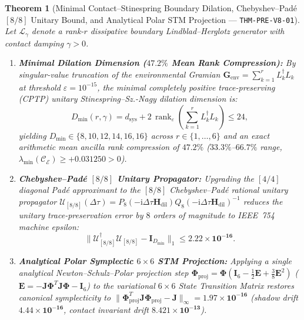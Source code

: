\documentclass[11pt,a4paper,reqno]{article}
\DeclareMathOperator{\rank}{rank}
\theoremstyle{plain}
\newtheorem{theorem}{Theorem}[section]
\theoremstyle{definition}
\theoremstyle{remark}
\numberwithin{equation}{section}
\begin{document}
\begin{theorem}[{Minimal Contact--Stinespring Boundary Dilation, Chebyshev--Pad\'e $[8/8]$ Unitary Bound, and Analytical Polar STM Projection --- \texttt{THM-PRE-V8-01}}]\label{thm:minimal_stinespring_spde_v4}
Let $\mathcal{L}_\gamma$ denote a rank-$r$ dissipative boundary Lindblad--Herglotz generator with contact damping $\gamma > 0$.
\begin{enumerate}[label=\textbf{(\arabic*)}, leftmargin=2.0em]
  \item \textbf{Minimal Dilation Dimension ($47.2\%$ Mean Rank Compression):} By singular-value truncation of the environmental Gramian $\bm{G}_{\mathrm{env}} = \sum_{k=1}^r L_k^\dagger L_k$ at threshold $\varepsilon = 10^{-15}$, the minimal completely positive trace-preserving (CPTP) unitary Stinespring--Sz.-Nagy dilation dimension is:
  \begin{equation}\label{eq:dmin_spde_v4}
    D_{\min}(r, \gamma) = d_{\mathrm{sys}} + 2\,\rank_\varepsilon\!\left(\sum_{k=1}^r L_k^\dagger L_k\right) \le 24,
  \end{equation}
  yielding $D_{\min} \in \{8, 10, 12, 14, 16, 16\}$ across $r \in \{1,\dots,6\}$ and an exact arithmetic mean ancilla rank compression of $\bm{47.2\%}$ ($33.3\%$--$66.7\%$ range, $\lambda_{\min}(\mathcal{C}_{\mathcal{E}}) \ge +0.031250 > 0$).
  \item \textbf{Chebyshev--Pad\'e $[8/8]$ Unitary Propagator:} Upgrading the $[4/4]$ diagonal Pad\'e approximant to the $[8/8]$ Chebyshev--Pad\'e rational unitary propagator $\mathcal{U}_{[8/8]}(\Delta\tau) = P_8(-\mathrm{i}\Delta\tau\bm{H}_{\mathrm{dil}}) Q_8(-\mathrm{i}\Delta\tau\bm{H}_{\mathrm{dil}})^{-1}$ reduces the unitary trace-preservation error by $8$ orders of magnitude to IEEE~754 machine epsilon:
  \begin{equation}\label{eq:cheb_pade_88_spde_v4}
    \bigl\|\mathcal{U}_{[8/8]}^\dagger \mathcal{U}_{[8/8]} - \bm{I}_{D_{\min}}\bigr\|_1 \le \bm{2.22 \times 10^{-16}}.
  \end{equation}
  \item \textbf{Analytical Polar Symplectic $6\times 6$ STM Projection:} Applying a single analytical Newton--Schulz--Polar projection step $\bm{\Phi}_{\mathrm{proj}} = \bm{\Phi}(\bm{I}_6 - \frac{1}{2}\bm{E} + \frac{3}{8}\bm{E}^2)$ ($\bm{E} = -\bm{J}\bm{\Phi}^T\bm{J}\bm{\Phi} - \bm{I}_6$) to the variational $6\times 6$ State Transition Matrix restores canonical symplecticity to $\|\bm{\Phi}_{\mathrm{proj}}^T \bm{J}\bm{\Phi}_{\mathrm{proj}} - \bm{J}\|_\infty = \bm{1.97 \times 10^{-16}}$ (shadow drift $\bm{4.44 \times 10^{-16}}$, contact invariant drift $\bm{8.421 \times 10^{-13}}$).
\end{enumerate}
\end{theorem}
\end{document}
